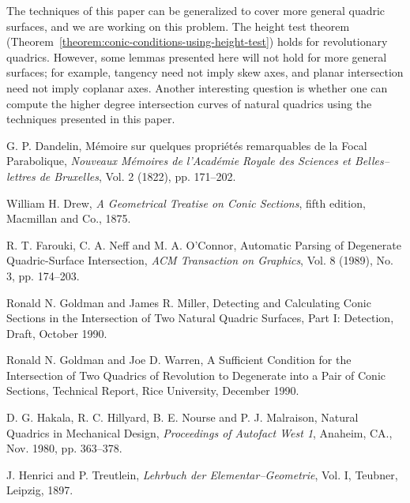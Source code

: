      The techniques of this paper can be generalized to cover more general 
quadric surfaces, and we are working on this problem.  The height test theorem 
(Theorem~\ref{theorem:conic-conditions-using-height-test}) holds for 
revolutionary quadrics.  However, some lemmas presented here will not hold for
more general surfaces; for example, tangency need not imply skew axes, and 
planar intersection need not imply coplanar axes.
Another interesting question is whether one can compute the higher degree
intersection curves of natural quadrics using the techniques presented in this
paper.



\begin{thebibliography}{999}

     G. P. Dandelin,
     M\'{e}moire sur quelques propri\'{e}t\'{e}s remarquables de la Focal
     Parabolique,
     {\em Nouveaux M\'{e}moires de l'Acad\'{e}mie Royale des Sciences et
     Belles--lettres de Bruxelles},
     Vol. 2 (1822), pp. 171--202.

     William H. Drew,
     {\em A Geometrical Treatise on Conic Sections},
     fifth edition,
     Macmillan and Co., 1875.

     R. T. Farouki, C. A. Neff and M. A. O'Connor,
     Automatic Parsing of Degenerate Quadric-Surface Intersection,
     {\em ACM Transaction on Graphics},
     Vol. 8 (1989), No. 3, pp. 174--203.

     Ronald N. Goldman and James R. Miller,
     Detecting and Calculating Conic Sections in the Intersection of Two
     Natural Quadric Surfaces, Part I: Detection,
     Draft, October 1990.

     Ronald N. Goldman and Joe D. Warren,
     A Sufficient Condition for the Intersection of Two Quadrics of 
     Revolution to Degenerate into a Pair of Conic Sections,
     Technical Report, Rice University, December 1990.

     D. G. Hakala, R. C. Hillyard, B. E. Nourse and P. J. Malraison,
     Natural Quadrics in Mechanical Design,
     {\em Proceedings of Autofact West 1}, 
     Anaheim, CA., Nov. 1980, pp. 363--378.

     J. Henrici and P. Treutlein,
     {\em Lehrbuch der Elementar--Geometrie}, Vol. I,
     Teubner, Leipzig, 1897.


\end{thebibliography}
